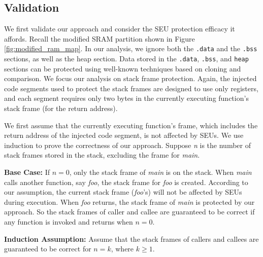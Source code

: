 \subsection{Validation}
We first validate our approach and consider the SEU protection efficacy it affords. Recall the modified SRAM partition shown in Figure \ref{fig:modified_ram_map}. In our analysis, we ignore both the \texttt{.data} and the \texttt{.bss} sections, as well as the heap section. Data stored in the \texttt{.data}, \texttt{.bss}, and \texttt{heap} sections can be protected using well-known techniques based on cloning and comparison. We focus our analysis on stack frame protection. Again, the injected code segments used to protect the stack frames are designed to use only registers, and each segment requires only two bytes in the currently executing function's stack frame (for the return address).

We first assume that the currently executing function's frame, which includes the return address of the injected code segment, is not affected by SEUs. We use induction to prove the correctness of our approach. Suppose \textit{n} is the number of stack frames stored in the stack, excluding the frame for \textit{main}.

\textbf{Base Case:} If $n=0$, only the stack frame of \textit{main} is on the stack. When \textit{main} calls another function, say \textit{foo}, the stack frame for \textit{foo} is created. According to our assumption, the current stack frame (\textit{foo}'s) will not be affected by SEUs during execution. When \textit{foo} returns, the stack frame of \textit{main} is protected by our approach. So the stack frames of caller and callee are guaranteed to be correct if any function is invoked and returns when $n=0$.

\textbf{Induction Assumption:} Assume that the stack frames of callers and callees are guaranteed to be correct for $n=k$, where $k\geq 1$.

